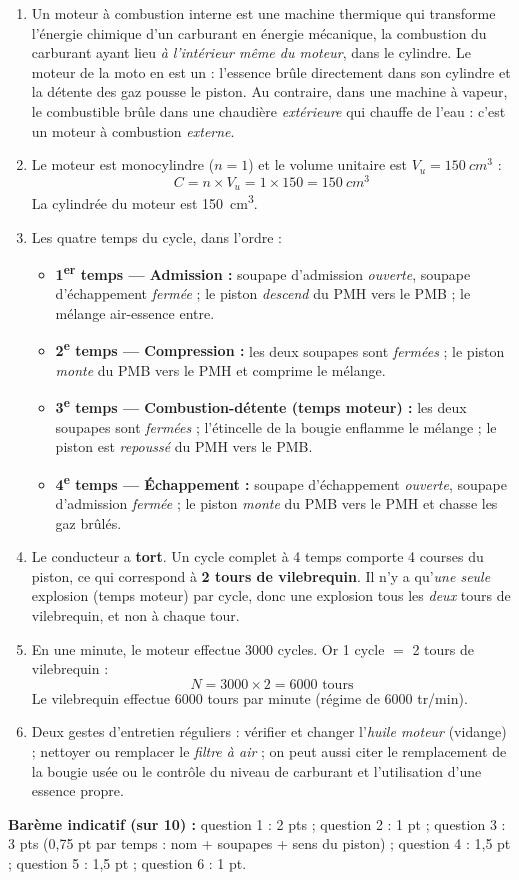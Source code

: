 \documentclass[11pt]{article}
\newcommand{\cle}[1]{{\popxbold\color{popdark}#1}}
\begin{document}
\begin{corrige}
\begin{enumerate}
\item Un \cle{moteur à combustion interne} est une machine thermique qui transforme l'énergie chimique d'un carburant en énergie mécanique, la combustion du carburant ayant lieu \emph{à l'intérieur même du moteur}, dans le cylindre. Le moteur de la moto en est un : l'essence brûle directement dans son cylindre et la détente des gaz pousse le piston. Au contraire, dans une machine à vapeur, le combustible brûle dans une chaudière \emph{extérieure} qui chauffe de l'eau : c'est un moteur à combustion \emph{externe}.
\item Le moteur est monocylindre ($n = 1$) et le volume unitaire est $V_u = \SI{150}{cm^3}$ :
\[ C = n \times V_u = 1 \times 150 = \SI{150}{cm^3} \]
La cylindrée du moteur est \SI{150}{cm^3}.
\item Les quatre temps du cycle, dans l'ordre :
\begin{itemize}
\item \textbf{1\textsuperscript{er} temps — Admission :} soupape d'admission \emph{ouverte}, soupape d'échappement \emph{fermée} ; le piston \emph{descend} du PMH vers le PMB ; le mélange air-essence entre.
\item \textbf{2\textsuperscript{e} temps — Compression :} les deux soupapes sont \emph{fermées} ; le piston \emph{monte} du PMB vers le PMH et comprime le mélange.
\item \textbf{3\textsuperscript{e} temps — Combustion-détente (temps moteur) :} les deux soupapes sont \emph{fermées} ; l'étincelle de la bougie enflamme le mélange ; le piston est \emph{repoussé} du PMH vers le PMB.
\item \textbf{4\textsuperscript{e} temps — Échappement :} soupape d'échappement \emph{ouverte}, soupape d'admission \emph{fermée} ; le piston \emph{monte} du PMB vers le PMH et chasse les gaz brûlés.
\end{itemize}
\item Le conducteur a \textbf{tort}. Un cycle complet à 4 temps comporte 4 courses du piston, ce qui correspond à \textbf{2 tours de vilebrequin}. Il n'y a qu'\emph{une seule} explosion (temps moteur) par cycle, donc une explosion tous les \emph{deux} tours de vilebrequin, et non à chaque tour.
\item En une minute, le moteur effectue \num{3000} cycles. Or 1 cycle $=$ 2 tours de vilebrequin :
\[ N = 3000 \times 2 = \num{6000} \text{ tours} \]
Le vilebrequin effectue \num{6000} tours par minute (régime de \num{6000} tr/min).
\item Deux gestes d'entretien réguliers : vérifier et changer l'\emph{huile moteur} (vidange) ; nettoyer ou remplacer le \emph{filtre à air} ; on peut aussi citer le remplacement de la bougie usée ou le contrôle du niveau de carburant et l'utilisation d'une essence propre.
\end{enumerate}
\textbf{Barème indicatif (sur 10) :} question 1 : 2 pts ; question 2 : 1 pt ; question 3 : 3 pts (0,75 pt par temps : nom + soupapes + sens du piston) ; question 4 : 1,5 pt ; question 5 : 1,5 pt ; question 6 : 1 pt.


\end{corrige}
\end{document}
